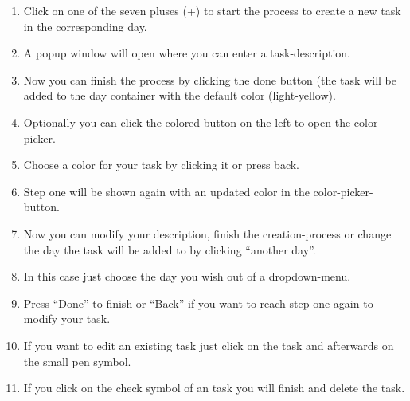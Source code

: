 \begin{enumerate}
	\item Click on one of the seven pluses (+) to start the process to create a new task in the corresponding day. 
	\item A popup window will open where you can enter a task-description.
	\item Now you can finish the process by clicking the done button (the task will be added to the day container with the default color (light-yellow). 
	\item Optionally you can click the colored button on the left to open the color-picker.
	\item Choose a color for your task by clicking it or press back. 
	\item Step one will be shown again with an updated color in the color-picker-button.
	\item Now you can modify your description, finish the creation-process or change the day the task will be added to by clicking “another day”.
	\item In this case just choose the day you wish out of a dropdown-menu.
	\item Press “Done” to finish or “Back” if you want to reach step one again to modify your task.
	\item If you want to edit an existing task just click on the task and afterwards on the small pen symbol.
	\item If you click on the check symbol of an task you will finish and delete the task.
\end{enumerate}
